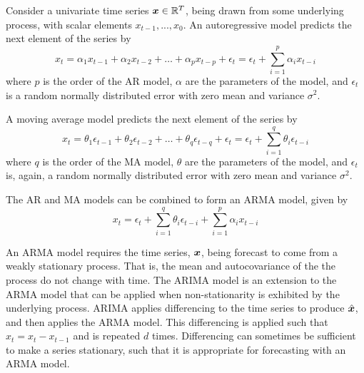 Consider a univariate time series ${\bm{x}} \in \mathbb{R}^{T}$, being drawn from some underlying process, with scalar elements $x_{t-1}, ..., x_{0}$. 
An autoregressive model predicts the next element of the series by
\begin{equation}
x_{t} = \alpha_{1}x_{t-1} + \alpha_{2}x_{t-2} + \ldots + \alpha_{p}x_{t-p} + \epsilon_{t} = \epsilon_{t} + \sum_{i=1}^{p}\alpha_{i}x_{t-i}
\end{equation}
where $p$ is the order of the AR model, $\alpha$ are the parameters of the model, and $\epsilon_{t}$ is a random normally distributed error with zero mean and variance $\sigma^2$. 

A moving average model predicts the next element of the series by
\begin{equation}
x_{t} = \theta_{1}\epsilon_{t-1} + \theta_{2}\epsilon_{t-2} + \ldots + \theta_{q}\epsilon_{t-q} + \epsilon_{t} = \epsilon_{t} + \sum_{i=1}^{q}\theta_{i}\epsilon_{t-i}
\end{equation}
where $q$ is the order of the MA model, $\theta$ are the parameters of the model, and $\epsilon_{t}$ is, again, a random normally distributed error with zero mean and variance $\sigma^2$.

The AR and MA models can be combined to form an ARMA model, given by 
\begin{equation}
x_{t} = \epsilon_{t} + \sum_{i=1}^{q}\theta_{i}\epsilon_{t-i} + \sum_{i=1}^{p}\alpha_{i}x_{t-i}
\end{equation}

An ARMA model requires the time series, ${\bm{x}}$, being forecast to come from a weakly stationary process.
That is, the mean and autocovariance of the the process do not change with time.
The ARIMA model is an extension to the ARMA model that can be applied when non-stationarity is exhibited by the underlying process.
ARIMA applies differencing to the time series to produce $\hat{{\bm{x}}}$, and then applies the ARMA model.
This differencing is applied such that $\hat{x}_{t} = x_{t} - x_{t-1}$ and is repeated $d$ times.
Differencing can sometimes be sufficient to make a series stationary, such that it is appropriate for forecasting with an ARMA model.

